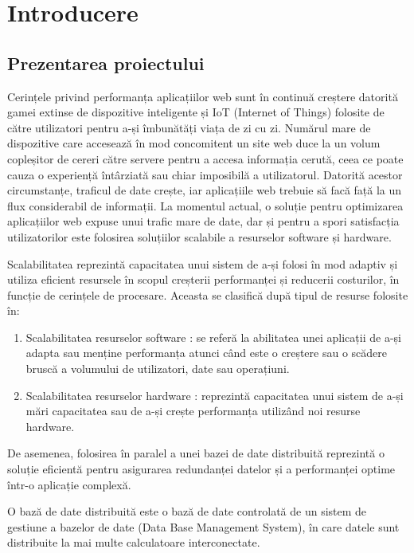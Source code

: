 \documentclass[12pt, a4paper, oneside, romanian]{teza-upb}
\begin{document}
	
	\afterpreface 
	\chapter{Introducere}
	\section{Prezentarea proiectului}
	
	Cerințele privind performanța aplicațiilor web sunt în continuă creștere datorită gamei extinse de dispozitive inteligente și IoT (Internet of Things) folosite de către utilizatori pentru a-și îmbunătăți viața de zi cu zi. Numărul mare de dispozitive care accesează în mod concomitent un site web duce la un volum copleșitor de cereri către servere pentru a accesa informația cerută, ceea ce poate cauza o experiență întârziată sau chiar imposibilă a utilizatorul. Datorită acestor circumstanțe, traficul de date crește, iar aplicațiile web trebuie să facă față la un flux considerabil de informații. La momentul actual, o soluție pentru optimizarea aplicațiilor web expuse unui trafic mare de date, dar și pentru a spori satisfacția utilizatorilor este folosirea soluțiilor scalabile a resurselor software și hardware. 
	
	Scalabilitatea \cite{scal} reprezintă capacitatea unui sistem de a-și folosi în mod adaptiv și utiliza eficient resursele în scopul creșterii performanței și reducerii costurilor, în funcție de cerințele de procesare. Aceasta se clasifică după tipul de resurse folosite în: 
	\begin{enumerate}
		\item Scalabilitatea resurselor software \cite{scal.soft}: se referă la abilitatea unei aplicații de a-și adapta sau menține performanța atunci când este o creștere sau o scădere bruscă a volumului de utilizatori, date sau operațiuni. 
		
		\item Scalabilitatea resurselor hardware \cite{scal.hard}: reprezintă capacitatea unui sistem de a-și mări capacitatea sau de a-și crește performanța utilizând noi resurse hardware. 
	\end{enumerate}
	De asemenea, folosirea în paralel a unei bazei de date distribuită reprezintă o soluție eficientă pentru asigurarea redundanței datelor și a performanței optime într-o aplicație complexă. 
	
	O bază de date distribuită \cite{bd} este o bază de date controlată de un sistem de gestiune a bazelor de date (Data Base Management System), în care datele sunt distribuite la mai multe calculatoare interconectate.
	
\end{document}
